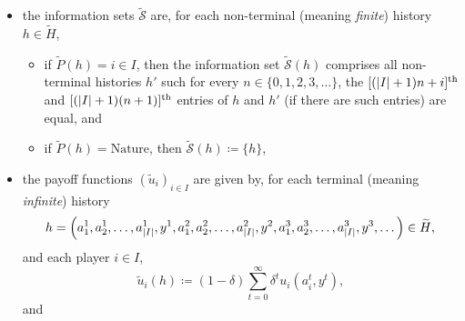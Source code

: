 \begin{remark}
\begin{itemize}
\begin{itemize}
			\item $\widetilde{A}(h) \coloneqq A_1$ and $\widetilde{P}(h) \coloneqq 1$ if $\text{length}(h) = (\abs*{I}+1) n$ for some $n \in \{0,1,2,3,\dots\}$,
		
			\item $\widetilde{A}(h) \coloneqq A_2$ and $\widetilde{P}(h) \coloneqq 2$ if $\text{length}(h) = (\abs*{I}+1) n + 1$ for some $n \in \{0,1,2,3,\dots\}$,

			\item[\vdots]

			\item $\widetilde{A}(h) \coloneqq A_{\abs*{I}}$ and $\widetilde{P}(h) \coloneqq \abs*{I}$ if $\text{length}(h) = (\abs*{I}+1) n + \abs*{I}-1$ for some $n \in \{0,1,2,3,\dots\}$, and

			\item $\widetilde{A}(h) \coloneqq Y$ and $\widetilde{P}(h) \coloneqq \text{Nature}$ if $\text{length}(h) = (\abs*{I}+1) n + \abs*{I}$ for some $n \in \{0,1,2,3,\dots\}$,
		
		\end{itemize}

		\item the information sets $\widetilde{\mathcal{S}}$ are, for each non-terminal (meaning \emph{finite}) history $h \in \widetilde{H}$,

		\begin{itemize}
		
			\item if $\widetilde{P}(h) = i \in I$, then the information set $\widetilde{\mathcal{S}}(h)$ comprises all non-terminal histories $h'$ such for every $n \in \{0,1,2,3,\dots\}$, the $[(\abs*{I}+1) n + i]^\text{th}$ and $[(\abs*{I}+1) (n+1)]^\text{th}$ entries of $h$ and $h'$ (if there are such entries) are equal, and

			\item if $\widetilde{P}(h) = \text{Nature}$, then $\widetilde{\mathcal{S}}(h) \coloneqq \{h\}$,
		
		\end{itemize}

		\item the payoff functions $\left(\widetilde{u}_i\right)_{i \in I}$ are given by, for each terminal (meaning \emph{infinite}) history
		\begin{equation*}
			h = \left(a_1^1,a_2^1,\dots,a_{\abs*{I}}^1,y^1,a_1^2,a_2^2,\dots,a_{\abs*{I}}^2,y^2,a_1^3,a_2^3,\dots,a_{\abs*{I}}^3,y^3,\dots\right) \in \widetilde{H} ,
		\end{equation*}
		and each player $i \in I$,
		\begin{equation*}
			\widetilde{u}_i(h) \coloneqq (1-\delta) \sum_{t=0}^\infty \delta^t u_i(a_i^t,y^t) ,
		\end{equation*}
		and


\end{itemize}
\end{remark}
